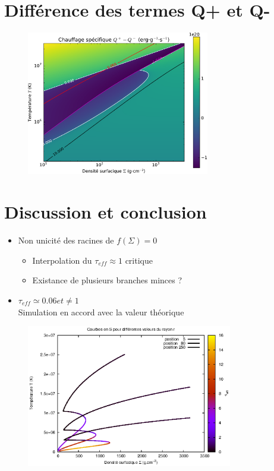 \section{Différence des termes Q+ et Q-}
\begin{frame}

   \begin{figure}[htb!]
      \includegraphics[width=8cm]{figures/Qmap.pdf}
   \end{figure}
\end{frame}


\section{Discussion et conclusion}
\begin{frame}

   \begin{itemize}
      \item Non unicité des racines de $f(\Sigma) = 0$
      \\
         \begin{itemize}
            \item Interpolation du $\tau_{eff} \approx 1$ critique
            \item Existance de plusieurs branches minces ? 
         \end{itemize}  
      \item $\tau_{eff} \simeq 0.06 et \neq 1$ 
      \\
Simulation en accord avec la valeur théorique
   \end{itemize}
\end{frame}


\begin{frame}

   \begin{figure}[htb!]
      \includegraphics[width=9cm]{figures/S_curves_tau.eps}
   \end{figure}
\end{frame}
